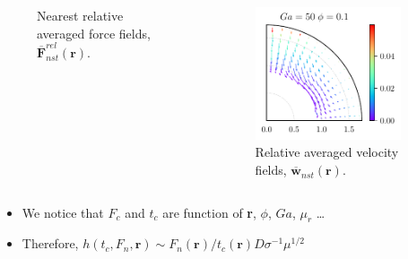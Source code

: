 \documentclass{sintefbeamer}
\newcommand{\nstavg}[1]{\overline{#1}_{nst}}
\newcommand{\nstrelavg}[1]{\overline{#1}_{nst}^{rel}}
\begin{document}
\begin{frame}
\begin{columns}
\begin{columns}
\begin{figure}
        \caption{Nearest relative averaged force fields, $\nstrelavg{\textbf{F}}(\textbf{r})$.}
      \end{figure}
      \centering
      \begin{figure}
      \includegraphics[width=0.9\textwidth]{image/HOMOGENEOUS/fDrop/U_mu_r_0_1_Ga_50_PHI_0_1.pdf}
      \caption{Relative averaged velocity fields, $\nstavg{\textbf{w}}(\textbf{r})$.}
    \end{figure}
    \end{columns}
  \end{columns}
  \begin{itemize}
    \item We notice that $F_c$ and $t_c$ are function of \textbf{r}, $\phi$, $Ga$, $\mu_r$ \ldots
    \item Therefore,
    $ h(t_c,F_n,\textbf{r})  \sim F_n(\textbf{r}) / t_c(\textbf{r}) D \sigma^{-1} \mu^{1/2}$
  \end{itemize}
\end{frame}
\end{document}

